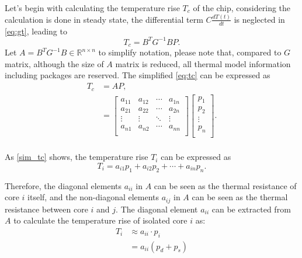 Let's begin with calculating the temperature rise $T_{c}$ of the chip, considering the calculation is done in steady state, the differential term $C\frac{dT(t)}{dt}$ is neglected in \eqref{eq:gt}, leading to
\begin{equation}\label{eq:tc}
T_{c} = B^{T}G^{-1}BP.
\end{equation}
Let $A = B^{T}G^{-1}B \in \mathbb{R}^{n \times n}$ to simplify notation, please note that, compared to $G$ matrix, although the size of $A$ matrix is reduced, all thermal model information including packages are reserved. The simplified 
\eqref{eq:tc} can be expressed as
\begin{equation}\label{sim_tc}
\begin{split}
T_{c} &= AP,\\
&=
{\left[
\begin{matrix}
 a_{11} & a_{12} & \cdots & a_{1n} \\
 a_{21} & a_{22} & \cdots & a_{2n} \\
 \vdots & \vdots & \ddots & \vdots \\
 a_{n1} & a_{n2} & \cdots & a_{nn} \\
\end{matrix}
\right]}
{\left[
\begin{matrix}
 p_{1}   \\
 p_{2}   \\
 \vdots  \\
 p_{n}   \\
\end{matrix}
\right]}.\\
\end{split}
\end{equation}

As \eqref{sim_tc} shows, the temperature rise $T_{i}$ can be expressed as
\begin{equation}\label{eq:ti}
T_{i} =a_{i1}p_{1} + a_{i2}p_{2} +\cdots + a_{in}p_{n}. 
\end{equation}

Therefore, the diagonal elements $a_{ii}$ in $A$ can be seen as the thermal resistance of core $i$ itself, and the non-diagonal elements $a_{ij}$ in $A$ can be seen as the thermal resistance between core $i$ and $j$. The diagonal element $a_{ii}$ can be extracted from $A$ to calculate the temperature rise of isolated core $i$ as:
\begin{equation}\label{eq:t_ap}
\begin{split}
T_{i}&\approx a_{ii} \cdot p_{i}\\
&=a_{ii}(p_{d}+p_{s})
\end{split}
\end{equation}

